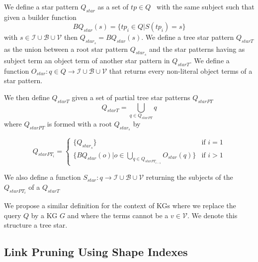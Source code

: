 \begin{definition}\label{def:starPattern}
   We define a star pattern $Q_{star}$ as a set of $tp \in Q$~\cite{Karim2020} with the same subject such that 
   given a builder function 
   \begin{equation}
       BQ_{star}(s) = \{tp_i \in Q| S(tp_i) = s\}
   \end{equation}
   with $s \in \mathcal{I} \cup \mathcal{B} \cup \mathcal{V}$ then $Q_{star_s} = BQ_{star}(s)$.
   We define a tree star pattern $Q_{starT}$ as the union between a root star pattern $Q_{star_s}$
   and the star patterns having as subject term an object term of another star pattern in $Q_{starT}$.
   We define a function 
   $O_{star}: q \in Q \rightarrow  \mathcal{I} \cup \mathcal{B} \cup \mathcal{V}$
   that returns every non-literal object terms of a star pattern.

   We then define $Q_{starT}$ given a  set of partial tree star patterns $Q_{starPT}$
   \begin{equation}
       Q_{starT} = \bigcup_{q \in Q_{starPT}} q
   \end{equation}
   where $Q_{starPT}$ is formed with a root $Q_{star_s}$ by

   \begin{equation}
           Q_{starPT_i} =
       \begin{cases}
           \{Q_{star_s}\} & \text{if } i = 1 \\
           \{BQ_{star}(o)| o \in \bigcup\limits_{q \in Q_{starPT_{i-1}}} O_{star}(q)\} & \text{if } i>1
       \end{cases}
   \end{equation}

   We also define a function  
   $S_{star}: q \rightarrow  \mathcal{I} \cup \mathcal{B} \cup \mathcal{V}$
   returning the subjects of the $Q_{starPT_i}$ of a $Q_{starT}$

   We propose a similar definition for the context of KGs where we replace the query $Q$ by a KG $G$ and where the terms 
   cannot be a $v \in \mathcal{V}$. 
   We denote this structure a tree star.
\end{definition}

\subsection{Link Pruning Using Shape Indexes}\label{sec:sourceSelection}

